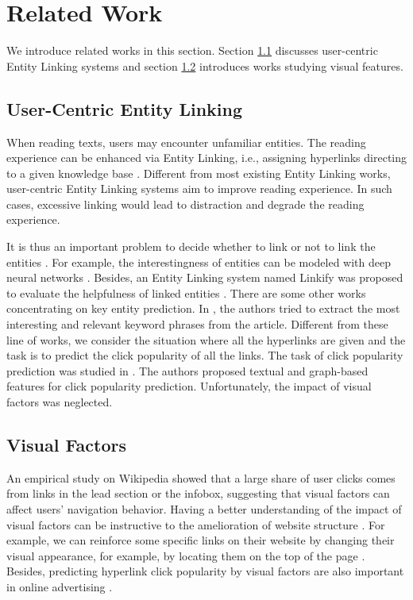 \section{Related Work}

We introduce related works in this section. Section \ref{related_1} discusses user-centric Entity Linking systems and section \ref{related_2} introduces works studying visual features.

\subsection{User-Centric Entity Linking} \label{related_1}

When reading texts, users may encounter unfamiliar entities. The reading experience can be enhanced via Entity Linking, i.e., assigning hyperlinks directing to a given knowledge base \cite{milne2008learning, csomai2008linking,mihalcea2007wikify, cucerzan-2007-large}. Different from most existing Entity Linking works, user-centric Entity Linking systems \cite{von2007leveraging} aim to improve reading experience. In such cases, excessive linking would lead to distraction and degrade the reading experience.

It is thus an important problem to decide whether to link or not to link the entities \cite{guo2013link}. For example, the interestingness of entities can be modeled with deep neural networks \cite{gao2014modeling}. Besides, an Entity Linking system named Linkify was proposed to evaluate the helpfulness of linked entities \cite{yamada2014evaluating, yamada2018linkify}. There are some other works concentrating on key entity prediction. In \cite{kraft2011contextual}, the authors tried to extract the most interesting and relevant keyword phrases from the article. Different from these line of works, we consider the situation where all the hyperlinks are given and the task is to predict the click popularity of all the links. The task of click popularity prediction was studied in \cite{thruesen2016link}. The authors proposed textual and graph-based features for click popularity prediction. Unfortunately, the impact of visual factors was neglected.

\subsection{Visual Factors} \label{related_2}

An empirical study on Wikipedia \cite{lamprecht2017structure} showed that a large share of user clicks comes from links in the lead section or the infobox, suggesting that visual factors can affect users' navigation behavior. Having a better understanding of the impact of visual factors can be instructive to the amelioration of website structure \cite{lamprecht2016evaluating, paranjape2016improving}. For example, we can reinforce some specific links on their website by changing their visual appearance, for example, by locating them on the top of the page \cite{geigl2016assessing}. Besides, predicting hyperlink click popularity by visual factors are also important in online advertising \cite{richardson2007predicting, zhu2017optimized}.

